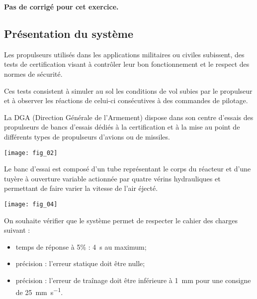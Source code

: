 \normaltrue \difficilefalse \tdifficilefalse
\correctionfalse




\setcounter{question}{0}
\ifcorrection
\else
\textbf{Pas de corrigé pour cet exercice.}
\fi


\subsection*{Présentation du système}
\ifprof
\else
Les propulseurs utilisés dans les applications militaires ou civiles subissent, des tests de certification
visant à contrôler leur bon fonctionnement et le respect des normes de sécurité.

Ces tests consistent à simuler au sol les conditions de vol subies par le propulseur et à observer les réactions de celui-ci
consécutives à des commandes de pilotage. 

La DGA (Direction Générale de l'Armement) dispose dans son centre d'essais des propulseurs de bancs d'essais
dédiés à la certification et à la mise au point de différents types de propulseurs d'avions ou de missiles.

\begin{center}
\texttt{[image: fig\_02]}
\end{center}

Le banc d'essai est composé d'un tube représentant le corps du réacteur et d'une tuyère à ouverture variable
actionnée par quatre vérins hydrauliques et permettant de faire varier la vitesse de l'air éjecté. 


\begin{center}
\texttt{[image: fig\_04]}
\end{center}

\fi

\begin{obj}
On souhaite vérifier que le système permet de respecter le cahier des charges suivant : 
\begin{itemize}
\item temps de réponse à 5\% : \SI{4}{s} au maximum;
\item précision : l'erreur statique doit être nulle;
\item précision : l'erreur de traînage doit être inférieure à \SI{1}{mm} pour une consigne de \SI{25}{mm.s^{-1}}.
\end{itemize}
\end{obj}


